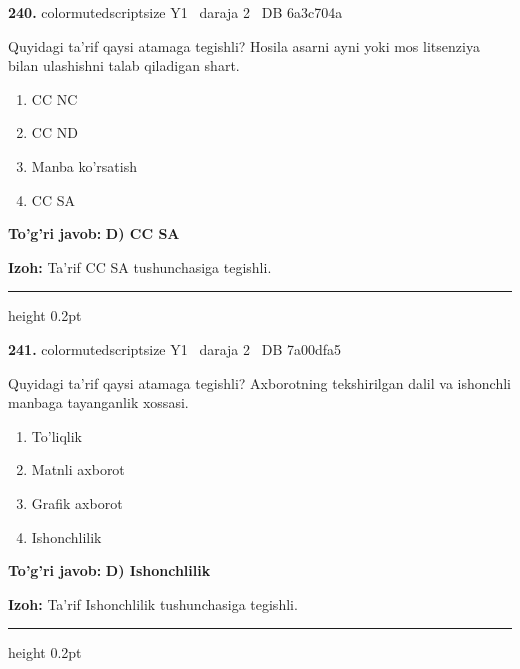 \documentclass[10pt,a4paper,oneside]{article}
\begin{document}
\noindent\textbf{\color{ink}240.}  {color{muted}scriptsize Y1 \textbullet\ daraja 2 \textbullet\ DB 6a3c704a}
\par
Quyidagi ta'rif qaysi atamaga tegishli? Hosila asarni ayni yoki mos litsenziya bilan ulashishni talab qiladigan shart.
\begin{enumerate}[label=\Alph*),leftmargin=9mm]
\item CC NC
\item CC ND
\item Manba ko'rsatish
\item CC SA
\end{enumerate}
\begin{tcolorbox}[enhanced,breakable,colback=teal!4,colframe=teal!50!black,boxrule=0.5pt,arc=1.1mm,left=3mm,right=3mm,top=1.7mm,bottom=1.7mm,before skip=2mm,after skip=2mm]
\textbf{\color{teal}To'g'ri javob:} \textbf{D) CC SA}
\par\smallskip
\textbf{Izoh:} Ta'rif CC SA tushunchasiga tegishli.
\end{tcolorbox}
\vspace{2mm}\hrule height 0.2pt \vspace{3mm}

\noindent\textbf{\color{ink}241.}  {color{muted}scriptsize Y1 \textbullet\ daraja 2 \textbullet\ DB 7a00dfa5}
\par
Quyidagi ta'rif qaysi atamaga tegishli? Axborotning tekshirilgan dalil va ishonchli manbaga tayanganlik xossasi.
\begin{enumerate}[label=\Alph*),leftmargin=9mm]
\item To'liqlik
\item Matnli axborot
\item Grafik axborot
\item Ishonchlilik
\end{enumerate}
\begin{tcolorbox}[enhanced,breakable,colback=teal!4,colframe=teal!50!black,boxrule=0.5pt,arc=1.1mm,left=3mm,right=3mm,top=1.7mm,bottom=1.7mm,before skip=2mm,after skip=2mm]
\textbf{\color{teal}To'g'ri javob:} \textbf{D) Ishonchlilik}
\par\smallskip
\textbf{Izoh:} Ta'rif Ishonchlilik tushunchasiga tegishli.
\end{tcolorbox}
\vspace{2mm}\hrule height 0.2pt \vspace{3mm}
\end{document}
